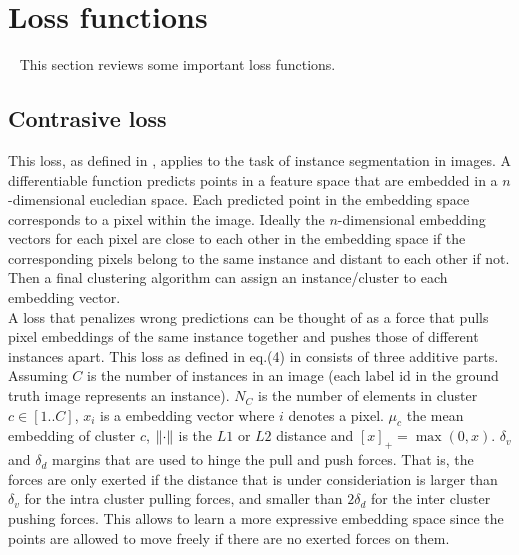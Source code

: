 \section{Loss functions}~\label{ssec:losses}
This section reviews some important loss functions.

\subsection{Contrasive loss}\label{ssec:loss_contrastive}

This loss, as defined in \cite{brab2017semantic}, applies to the task of instance segmentation in images. A differentiable function predicts points in a feature space that are embedded in a $n$-dimensional eucledian space. Each predicted point in the embedding space corresponds to a pixel within the image. Ideally the $n$-dimensional embedding vectors for each pixel are close to each other in the embedding space if the corresponding pixels belong to the same instance and distant to each other if not. Then a final clustering algorithm can assign an instance/cluster to each embedding vector.\\
A loss that penalizes wrong predictions can be thought of as a force that pulls pixel embeddings of the same instance together and pushes those of different instances apart.
This loss as defined in eq.(4) in \cite{brab2017semantic} consists of three additive parts. Assuming $C$ is the number of instances in an image (each label id in the ground truth image represents an instance). $N_C$ is the number of elements in cluster $c \in [1..C]$, $x_i$ is a embedding vector where $i$ denotes a pixel. $\mu_c$ the mean embedding of cluster $c$, $\left\lVert\cdot\right\rVert$ is the $L1$ or $L2$ distance and $[x]_+ = \max(0, x)$. $\delta_v$ and $\delta_d$ margins that are used to hinge the pull and push forces. That is, the forces are only exerted if the distance that is under consideriation is larger than $\delta_v$ for the intra cluster pulling forces, and smaller than $2\delta_d$ for the inter cluster pushing forces. This allows to learn a more expressive embedding space since the points are allowed to move freely if there are no exerted forces on them.\\

